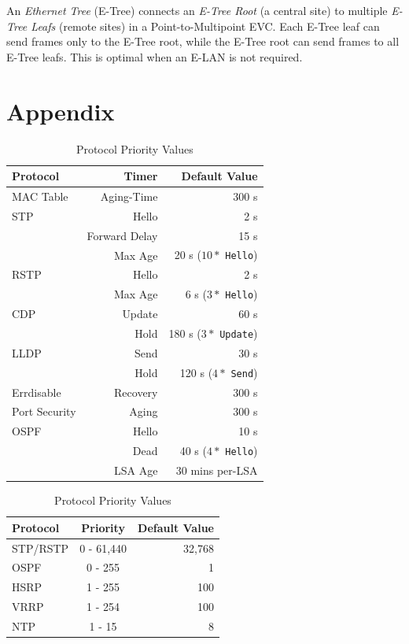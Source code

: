 \documentclass[12pt]{article}
\begin{document}
	An \textit{Ethernet Tree} (E-Tree) connects an \textit{E-Tree Root} (a central site) to multiple \textit{E-Tree Leafs} (remote sites) in a Point-to-Multipoint EVC. Each E-Tree leaf can send frames only to the E-Tree root, while the E-Tree root can send frames to all E-Tree leafs. This is optimal when an E-LAN is not required.





\section{Appendix \label{sec:APPENDIX}}
	\begin{table}[H]
	\begin{minipage}[t]{.55\linewidth}
	\centering
	\caption{Protocol Timers \label{tab:DEFAULT TIMERS}}
	\begin{tabular}{lrr}\hline
	\textbf{Protocol}		& \textbf{Timer}	& \textbf{Default Value}\\\hline
	MAC Table 			& Aging-Time	& 300 s\\\hline
	STP				& Hello		& 2 s\\
					& Forward Delay	& 15 s\\
					& Max Age		& 20 s ($10*$ \texttt{Hello})\\\hline
	RSTP				& Hello		& 2 s\\
					& Max Age		& 6 s ($3*$ \texttt{Hello})\\\hline
	CDP				& Update		& 60 s\\
					& Hold		& 180 s ($3*$ \texttt{Update})\\\hline
	LLDP				& Send		& 30 s\\
					& Hold		& 120 s ($4*$ \texttt{Send})\\\hline
	Errdisable			& Recovery 	& 300 s\\\hline
	Port Security		& Aging		& 300 s\\\hline
	OSPF				& Hello		& 10 s\\
					& Dead		& 40 s ($4*$ \texttt{Hello})\\
					& LSA Age		& 30 mins per-LSA\\\hline
	\end{tabular}\end{minipage}\hfill
	\begin{minipage}[t]{.45\linewidth}
	\centering
	\caption{Protocol Priority Values\label{tab:DEFAULT PRIORITIES}}
	\begin{tabular}{lcr}\hline
	\textbf{Protocol}		& \textbf{Priority}		& \textbf{Default Value}\\\hline
	STP/RSTP			& 0 - 61,440			& 32,768\\\hline
	OSPF				& 0 - 255			& 1\\\hline
	HSRP				& 1 - 255			& 100\\\hline
	VRRP				& 1 - 254			& 100\\\hline
	NTP				& 1 - 15			& 8\\\hline
	\end{tabular}\end{minipage}\end{table}
\end{document}

